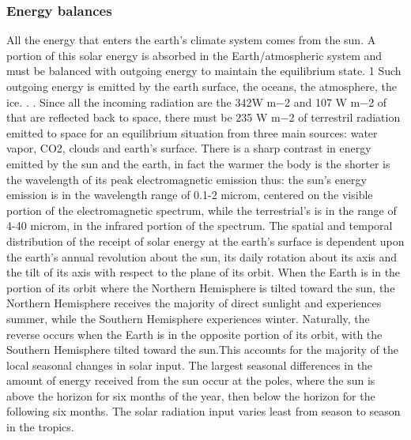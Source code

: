 \subsubsection{Energy balances }
All the energy that
enters the earth’s climate system comes from the sun. A portion of this solar energy is absorbed in the
Earth/atmospheric system and must be balanced with outgoing energy to maintain the equilibrium state.
1
Such outgoing energy is emitted by the earth surface, the oceans, the atmosphere, the ice. . . Since all the
incoming radiation are the 342W m−2 and 107 W m−2 of that are reflected back to space, there must be
235 W m−2 of terrestril radiation emitted to space for an equilibrium situation from three main sources:
water vapor, CO2, clouds and earth’s surface. There is a sharp contrast in energy emitted by the sun and
the earth, in fact the warmer the body is the shorter is the wavelength of its peak electromagnetic emission
thus: the sun’s energy emission is in the wavelength range of 0.1-2 microm, centered on the visible portion of
the electromagnetic spectrum, while the terrestrial’s is in the range of 4-40 microm, in the infrared portion
of the spectrum.
The spatial and temporal distribution of the receipt of solar energy at the earth’s surface is dependent upon
the earth’s annual revolution about the sun, its daily rotation about its axis and the tilt of its axis with
respect to the plane of its orbit. When the Earth is in the portion of its orbit where the Northern Hemisphere
is tilted toward the sun, the Northern Hemisphere receives the majority of direct sunlight and experiences
summer, while the Southern Hemisphere experiences winter. Naturally, the reverse occurs when the Earth
is in the opposite portion of its orbit, with the Southern Hemisphere tilted toward the sun.This accounts for
the majority of the local seasonal changes in solar input. The largest seasonal differences in the amount of
energy received from the sun occur at the poles, where the sun is above the horizon for six months of the
year, then below the horizon for the following six months. The solar radiation input varies least from season
to season in the tropics.

